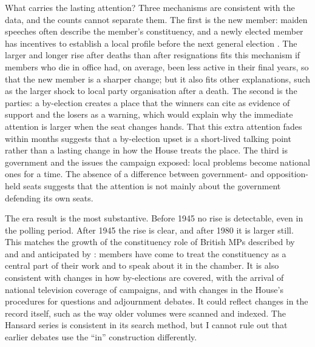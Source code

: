 \documentclass[11pt,a4paper]{article}
\begin{document}
What carries the lasting attention? Three mechanisms are consistent with the data, and the counts cannot separate them. The first is the new member: maiden speeches often describe the member's constituency, and a newly elected member has incentives to establish a local profile before the next general election \citep{cain1987,fenno1978}. The larger and longer rise after deaths than after resignations fits this mechanism if members who die in office had, on average, been less active in their final years, so that the new member is a sharper change; but it also fits other explanations, such as the larger shock to local party organisation after a death. The second is the parties: a by-election creates a place that the winners can cite as evidence of support and the losers as a warning, which would explain why the immediate attention is larger when the seat changes hands. That this extra attention fades within months suggests that a by-election upset is a short-lived talking point rather than a lasting change in how the House treats the place. The third is government and the issues the campaign exposed: local problems become national ones for a time. The absence of a difference between government- and opposition-held seats suggests that the attention is not mainly about the government defending its own seats.

The era result is the most substantive. Before 1945 no rise is detectable, even in the polling period. After 1945 the rise is clear, and after 1980 it is larger still. This matches the growth of the constituency role of British MPs described by \citet{norton1994} and \citet{norton1993} and anticipated by \citet{cain1987}: members have come to treat the constituency as a central part of their work and to speak about it in the chamber. It is also consistent with changes in how by-elections are covered, with the arrival of national television coverage of campaigns, and with changes in the House's procedures for questions and adjournment debates. It could reflect changes in the record itself, such as the way older volumes were scanned and indexed. The Hansard series is consistent in its search method, but I cannot rule out that earlier debates use the ``in'' construction differently.
\end{document}
